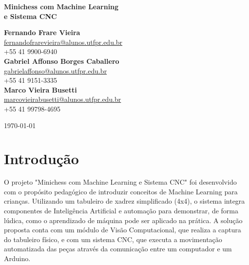 \documentclass[a4paper,12pt]{article}
\date{\today}
\begin{document}
\vspace{1em}

\begin{center}
    \Large\textbf{Minichess com Machine Learning \\e Sistema CNC}
\end{center}

\vspace{1em}

\begin{center}
    \textbf{Fernando Frare Vieira} \\
    \href{mailto:fernandofrarevieira@alunos.utfpr.edu.br}{fernandofrarevieira@alunos.utfpr.edu.br} \\
    +55 41 9900-6940 \\[1.5em]
    \textbf{Gabriel Affonso Borges Caballero} \\
    \href{mailto:gabrielaffonso@alunos.utfpr.edu.br}{gabrielaffonso@alunos.utfpr.edu.br} \\
    +55 41 9151-3335\\[1.5em]
    \textbf{Marco Vieira Busetti} \\
    \href{mailto:marcovieirabusetti@alunos.utfpr.edu.br}{marcovieirabusetti@alunos.utfpr.edu.br} \\
    +55 41 99798-4695
\end{center}

\vspace{1em}

\begin{center}
    \today
\end{center}

\vspace{2em}

\section{Introdução}
O projeto "Minichess com Machine Learning e Sistema CNC" \;foi desenvolvido com o propósito pedagógico de introduzir conceitos de Machine Learning para crianças. Utilizando um tabuleiro de xadrez simplificado (4x4), o sistema integra componentes de Inteligência Artificial e automação para demonstrar, de forma lúdica, como o aprendizado de máquina pode ser aplicado na prática. A solução proposta conta com um módulo de Visão Computacional, que realiza a captura do tabuleiro físico, e com um sistema CNC, que executa a movimentação automatizada das peças através da comunicação entre um computador e um Arduino.
\end{document}

